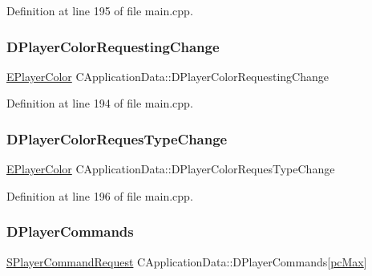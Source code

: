 Definition at line 195 of file main.\+cpp.

\hypertarget{classCApplicationData_a5231cd0c9d8bb76ab32c7f2a114e41f1}{}\label{classCApplicationData_a5231cd0c9d8bb76ab32c7f2a114e41f1} 
\subsubsection{\texorpdfstring{D\+Player\+Color\+Requesting\+Change}{DPlayerColorRequestingChange}}
{\footnotesize\ttfamily \hyperlink{GameDataTypes_8h_aafb0ca75933357ff28a6d7efbdd7602f}{E\+Player\+Color} C\+Application\+Data\+::\+D\+Player\+Color\+Requesting\+Change\hspace{0.3cm}{\ttfamily [protected]}}



Definition at line 194 of file main.\+cpp.

\hypertarget{classCApplicationData_a6724e09974db5fe5f147d9898f468dbc}{}\label{classCApplicationData_a6724e09974db5fe5f147d9898f468dbc} 
\subsubsection{\texorpdfstring{D\+Player\+Color\+Reques\+Type\+Change}{DPlayerColorRequesTypeChange}}
{\footnotesize\ttfamily \hyperlink{GameDataTypes_8h_aafb0ca75933357ff28a6d7efbdd7602f}{E\+Player\+Color} C\+Application\+Data\+::\+D\+Player\+Color\+Reques\+Type\+Change\hspace{0.3cm}{\ttfamily [protected]}}



Definition at line 196 of file main.\+cpp.

\hypertarget{classCApplicationData_a2df1addeb7622233f72dc056bbcf31a1}{}\label{classCApplicationData_a2df1addeb7622233f72dc056bbcf31a1} 
\subsubsection{\texorpdfstring{D\+Player\+Commands}{DPlayerCommands}}
{\footnotesize\ttfamily \hyperlink{structSPlayerCommandRequest}{S\+Player\+Command\+Request} C\+Application\+Data\+::\+D\+Player\+Commands\mbox{[}\hyperlink{GameDataTypes_8h_aafb0ca75933357ff28a6d7efbdd7602fa594a5c8dd3987f24e8a0f23f1a72cd34}{pc\+Max}\mbox{]}\hspace{0.3cm}{\ttfamily [protected]}}



